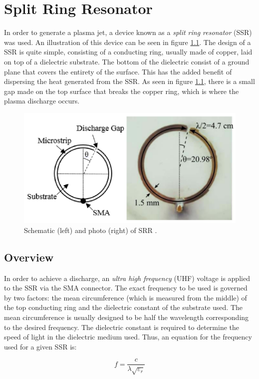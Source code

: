 \chapter{Split Ring Resonator}

In order to generate a plasma jet, a device known as a \textit{split ring resonator} (SSR) was used. An illustration of this device can be seen in figure \ref{fig:srr}. The design of a SSR is quite simple, consisting of a conducting ring, usually made of copper, laid on top of a dielectric substrate. The bottom of the dielectric consist of a ground plane that covers the entirety of the surface. This has the added benefit of dispersing the heat generated from the SSR. As seen in figure \ref{fig:srr}, there is a small gap made on the top surface that breaks the copper ring, which is where the plasma discharge occurs. 


\begin{figure}[h!]
	\centering
	\includegraphics[width=0.7\linewidth]{chapter_4/figures/split_ring_resonator.png}
	\caption{Schematic (left) and photo (right) of SRR \cite{Dextre2017}.}
	\label{fig:srr}
\end{figure}

\section{Overview}

In order to achieve a discharge, an \textit{ultra high frequency} (UHF) voltage is applied to the SSR via the SMA connector. The exact frequency to be used is governed by two factors: the mean circumference (which is measured from the middle) of the top conducting ring and the dielectric constant of the substrate used. The mean circumference is usually designed to be half the wavelength corresponding to the desired frequency. The dielectric constant is required to determine the speed of light in the dielectric medium used. Thus, an equation for the frequency used for a given SSR is:

\begin{equation}
     f = \frac{c}{\lambda\sqrt{\varepsilon_r}}
     \label{eq:resonant_frequency}
\end{equation}

